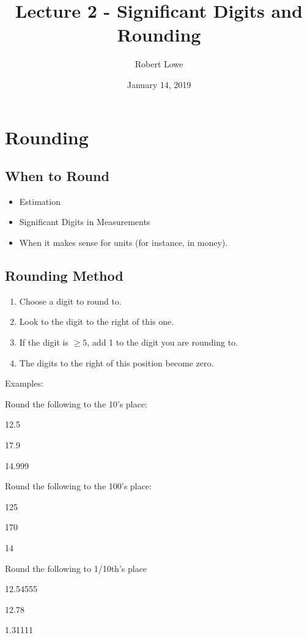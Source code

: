 \documentclass{article}
\title{Lecture 2 - Significant Digits and Rounding}
\author{Robert Lowe}
\date{January 14, 2019}
\begin{document}
\maketitle

\section{Rounding}
\subsection{When to Round}
\begin{itemize}
    \item Estimation
    \item Significant Digits in Measurements
    \item When it makes sense for units (for instance, in money).
\end{itemize}

\subsection{Rounding Method}
\begin{enumerate}
    \item Choose a digit to round to.
    \item Look to the digit to the right of this one.
    \item If the digit is $\geq 5$, add 1 to the digit you are rounding to.
    \item The digits to the right of this position become zero.
\end{enumerate}
Examples:

Round the following to the 10's place:
\begin{enumerate*}[label=\ \ (\alph*)]
    \item 12.5 
    \item 17.9
    \item 14.999
\end{enumerate*}

Round the following to the 100's place:
\begin{enumerate*}[label=\ \ (\alph*)]
    \item 125
    \item 170
    \item 14
\end{enumerate*}

Round the following to 1/10th's place
\begin{enumerate*}[label=\ \ (\alph*)]
    \item 12.54555
    \item 12.78
    \item 1.31111
\end{enumerate*}
\end{document}
